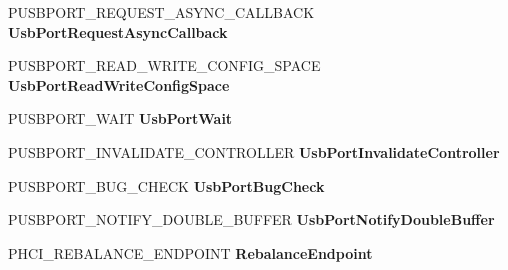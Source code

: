 \begin{DoxyCompactItemize}
P\+U\+S\+B\+P\+O\+R\+T\+\_\+\+R\+E\+Q\+U\+E\+S\+T\+\_\+\+A\+S\+Y\+N\+C\+\_\+\+C\+A\+L\+L\+B\+A\+CK {\bfseries Usb\+Port\+Request\+Async\+Callback}
\item 
\mbox{\label{struct___u_s_b_p_o_r_t___r_e_g_i_s_t_r_a_t_i_o_n___p_a_c_k_e_t_ad79e9c5cf11c71ceafe2ff1fbf625e9f}} 
P\+U\+S\+B\+P\+O\+R\+T\+\_\+\+R\+E\+A\+D\+\_\+\+W\+R\+I\+T\+E\+\_\+\+C\+O\+N\+F\+I\+G\+\_\+\+S\+P\+A\+CE {\bfseries Usb\+Port\+Read\+Write\+Config\+Space}
\item 
\mbox{\label{struct___u_s_b_p_o_r_t___r_e_g_i_s_t_r_a_t_i_o_n___p_a_c_k_e_t_ab95f9df850eabe10e1779f27bf3332d3}} 
P\+U\+S\+B\+P\+O\+R\+T\+\_\+\+W\+A\+IT {\bfseries Usb\+Port\+Wait}
\item 
\mbox{\label{struct___u_s_b_p_o_r_t___r_e_g_i_s_t_r_a_t_i_o_n___p_a_c_k_e_t_a2439f7dc65ff12ae341553ef5ebafb8f}} 
P\+U\+S\+B\+P\+O\+R\+T\+\_\+\+I\+N\+V\+A\+L\+I\+D\+A\+T\+E\+\_\+\+C\+O\+N\+T\+R\+O\+L\+L\+ER {\bfseries Usb\+Port\+Invalidate\+Controller}
\item 
\mbox{\label{struct___u_s_b_p_o_r_t___r_e_g_i_s_t_r_a_t_i_o_n___p_a_c_k_e_t_a726e76e74b41e6b2e3c8ca6772b5602d}} 
P\+U\+S\+B\+P\+O\+R\+T\+\_\+\+B\+U\+G\+\_\+\+C\+H\+E\+CK {\bfseries Usb\+Port\+Bug\+Check}
\item 
\mbox{\label{struct___u_s_b_p_o_r_t___r_e_g_i_s_t_r_a_t_i_o_n___p_a_c_k_e_t_a98de43af6860b4f52aefd92196acaa83}} 
P\+U\+S\+B\+P\+O\+R\+T\+\_\+\+N\+O\+T\+I\+F\+Y\+\_\+\+D\+O\+U\+B\+L\+E\+\_\+\+B\+U\+F\+F\+ER {\bfseries Usb\+Port\+Notify\+Double\+Buffer}
\item 
\mbox{\label{struct___u_s_b_p_o_r_t___r_e_g_i_s_t_r_a_t_i_o_n___p_a_c_k_e_t_af248ba7e8263cadc2c2595d74e7f3087}} 
P\+H\+C\+I\+\_\+\+R\+E\+B\+A\+L\+A\+N\+C\+E\+\_\+\+E\+N\+D\+P\+O\+I\+NT {\bfseries Rebalance\+Endpoint}
\item 
\mbox{\label{struct___u_s_b_p_o_r_t___r_e_g_i_s_t_r_a_t_i_o_n___p_a_c_k_e_t_a4fba7827e90c439cc6f1a59c35b9599d}} 

\end{DoxyCompactItemize}
